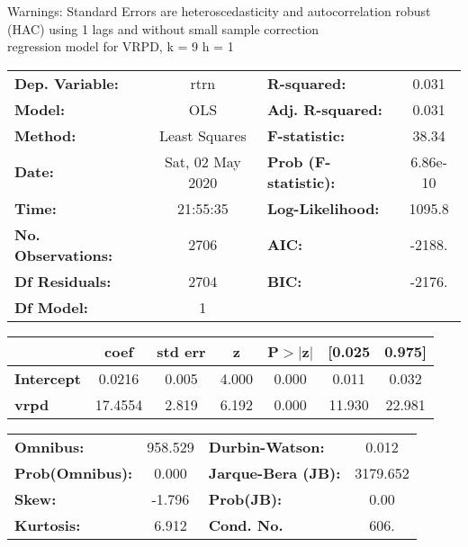 Warnings: \newline
 [1] Standard Errors are heteroscedasticity and autocorrelation robust (HAC) using 1 lags and without small sample correction\\ 

regression model for VRPD, k = 9 h = 1\begin{center}
\begin{tabular}{lclc}
\toprule
\textbf{Dep. Variable:}    &       rtrn       & \textbf{  R-squared:         } &     0.031   \\
\textbf{Model:}            &       OLS        & \textbf{  Adj. R-squared:    } &     0.031   \\
\textbf{Method:}           &  Least Squares   & \textbf{  F-statistic:       } &     38.34   \\
\textbf{Date:}             & Sat, 02 May 2020 & \textbf{  Prob (F-statistic):} &  6.86e-10   \\
\textbf{Time:}             &     21:55:35     & \textbf{  Log-Likelihood:    } &    1095.8   \\
\textbf{No. Observations:} &        2706      & \textbf{  AIC:               } &    -2188.   \\
\textbf{Df Residuals:}     &        2704      & \textbf{  BIC:               } &    -2176.   \\
\textbf{Df Model:}         &           1      & \textbf{                     } &             \\
\bottomrule
\end{tabular}
\begin{tabular}{lcccccc}
                   & \textbf{coef} & \textbf{std err} & \textbf{z} & \textbf{P$> |$z$|$} & \textbf{[0.025} & \textbf{0.975]}  \\
\midrule
\textbf{Intercept} &       0.0216  &        0.005     &     4.000  &         0.000        &        0.011    &        0.032     \\
\textbf{vrpd}      &      17.4554  &        2.819     &     6.192  &         0.000        &       11.930    &       22.981     \\
\bottomrule
\end{tabular}
\begin{tabular}{lclc}
\textbf{Omnibus:}       & 958.529 & \textbf{  Durbin-Watson:     } &    0.012  \\
\textbf{Prob(Omnibus):} &   0.000 & \textbf{  Jarque-Bera (JB):  } & 3179.652  \\
\textbf{Skew:}          &  -1.796 & \textbf{  Prob(JB):          } &     0.00  \\
\textbf{Kurtosis:}      &   6.912 & \textbf{  Cond. No.          } &     606.  \\
\bottomrule
\end{tabular}
\end{center}

